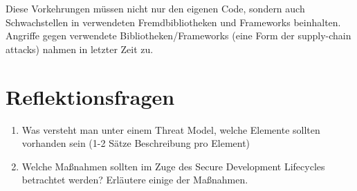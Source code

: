 Diese Vorkehrungen müssen nicht nur den eigenen Code, sondern auch Schwachstellen in verwendeten Fremdbibliotheken und Frameworks beinhalten. Angriffe gegen verwendete Bibliotheken/Frameworks (eine Form der supply-chain attacks) nahmen in letzter Zeit zu.

\section{Reflektionsfragen}

\begin{enumerate}
	\item Was versteht man unter einem Threat Model, welche Elemente sollten vorhanden sein (1-2 Sätze Beschreibung pro Element)
	\item Welche Maßnahmen sollten im Zuge des Secure Development Lifecycles betrachtet werden? Erläutere einige der Maßnahmen.
\end{enumerate}

